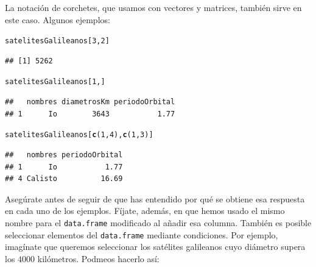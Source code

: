 \documentclass[10pt,a4paper]{article}\usepackage[]{graphicx}\usepackage[]{color}
\makeatletter
\newcommand{\hlnum}[1]{\textcolor[rgb]{0.686,0.059,0.569}{#1}}%
\newcommand{\hlstd}[1]{\textcolor[rgb]{0.345,0.345,0.345}{#1}}%
\newcommand{\hlkwd}[1]{\textcolor[rgb]{0.737,0.353,0.396}{\textbf{#1}}}%
\newenvironment{kframe}{%
 \def\at@end@of@kframe{}%
 \ifinner\ifhmode%
  \def\at@end@of@kframe{\end{minipage}}%
  \begin{minipage}{\columnwidth}%
 \fi\fi%
 \def\FrameCommand##1{\hskip\@totalleftmargin \hskip-\fboxsep
 \colorbox{shadecolor}{##1}\hskip-\fboxsep
     \hskip-\linewidth \hskip-\@totalleftmargin \hskip\columnwidth}%
 \MakeFramed {\advance\hsize-\width
   \@totalleftmargin\z@ \linewidth\hsize
   \@setminipage}}%
 {\par\unskip\endMakeFramed%
 \at@end@of@kframe}
\newenvironment{knitrout}{}{} %
\makeatother
\begin{document}
La notación de corchetes, que usamos con vectores y matrices, también sirve en este caso. Algunos  ejemplos:
\begin{knitrout}
\color{fgcolor}\begin{kframe}
\begin{alltt}
\hlstd{satelitesGalileanos[}\hlnum{3}\hlstd{,}\hlnum{2}\hlstd{]}
\end{alltt}
\begin{verbatim}
## [1] 5262
\end{verbatim}
\begin{alltt}
\hlstd{satelitesGalileanos[}\hlnum{1}\hlstd{, ]}
\end{alltt}
\begin{verbatim}
##   nombres diametrosKm periodoOrbital
## 1      Io        3643           1.77
\end{verbatim}
\begin{alltt}
\hlstd{satelitesGalileanos[}\hlkwd{c}\hlstd{(}\hlnum{1}\hlstd{,}\hlnum{4}\hlstd{),} \hlkwd{c}\hlstd{(}\hlnum{1}\hlstd{,}\hlnum{3}\hlstd{)]}
\end{alltt}
\begin{verbatim}
##   nombres periodoOrbital
## 1      Io           1.77
## 4 Calisto          16.69
\end{verbatim}
\end{kframe}
\end{knitrout}
Asegúrate antes de seguir de que has entendido por qué se obtiene esa respuesta en cada uno de los ejemplos. Fíjate, además, en que hemos usado el mismo nombre para el {\tt data.frame} modificado al añadir esa columna.
También es posible seleccionar elementos del {\tt data.frame} mediante condiciones. Por ejemplo, imagínate que queremos seleccionar los satélites galileanos cuyo diámetro supera los $4000$ kilómetros. Podmeos hacerlo así:
\end{document}
